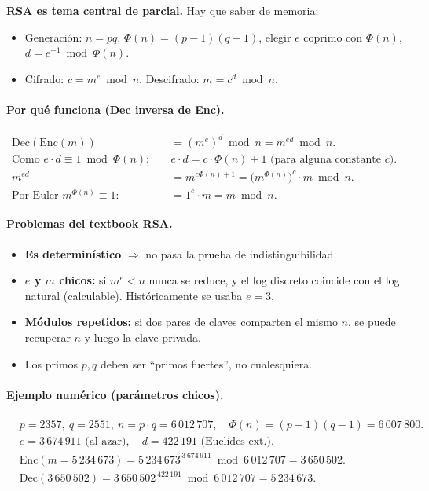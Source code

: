 \documentclass[../main.tex]{subfiles}
\begin{document}
\begin{examen}
\textbf{RSA es tema central de parcial.} Hay que saber de memoria:
\begin{itemize}[leftmargin=1.4em,nosep]
  \item Generación: $n=pq$, $\Phi(n)=(p-1)(q-1)$, elegir $e$ coprimo con $\Phi(n)$,
  $d=e^{-1}\bmod\Phi(n)$.
  \item Cifrado: $c=m^e \bmod n$. \qquad Descifrado: $m=c^d \bmod n$.
\end{itemize}
\end{examen}

\paragraph{Por qué funciona (Dec inversa de Enc).}
\begin{align*}
\mathrm{Dec}(\mathrm{Enc}(m)) &= (m^e)^d \bmod n = m^{ed}\bmod n.\\
\text{Como } e\cdot d\equiv 1 \bmod \Phi(n):\quad & e\cdot d = c\cdot\Phi(n)+1 \text{ (para alguna constante } c).\\
m^{ed} &= m^{c\Phi(n)+1} = \big(m^{\Phi(n)}\big)^{c}\cdot m \bmod n.\\
\text{Por Euler } m^{\Phi(n)}\equiv 1:\quad & = 1^c\cdot m = m \bmod n.
\end{align*}

\paragraph{Problemas del textbook RSA.}
\begin{itemize}[leftmargin=1.4em,nosep]
  \item \textbf{Es determinístico} $\Rightarrow$ no pasa la prueba de
  indistinguibilidad.
  \item \textbf{$e$ y $m$ chicos:} si $m^e<n$ nunca se reduce, y el log discreto
  coincide con el log natural (calculable). Históricamente se usaba $e=3$.
  \item \textbf{Módulos repetidos:} si dos pares de claves comparten el mismo $n$,
  se puede recuperar $n$ y luego la clave privada.
  \item Los primos $p,q$ deben ser ``primos fuertes'', no cualesquiera.
\end{itemize}

\paragraph{Ejemplo numérico (parámetros chicos).}
\begin{align*}
&p=2357,\ q=2551,\ n=p\cdot q=6\,012\,707,\quad \Phi(n)=(p-1)(q-1)=6\,007\,800.\\
&e=3\,674\,911 \text{ (al azar)},\quad d=422\,191 \text{ (Euclides ext.)}.\\
&\mathrm{Enc}(m=5\,234\,673)=5\,234\,673^{\,3\,674\,911}\bmod 6\,012\,707=3\,650\,502.\\
&\mathrm{Dec}(3\,650\,502)=3\,650\,502^{\,422\,191}\bmod 6\,012\,707=5\,234\,673.
\end{align*}
\end{document}
